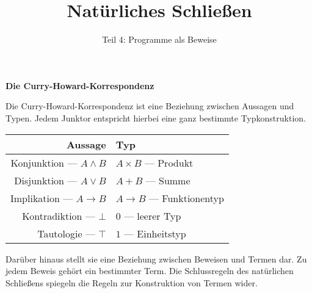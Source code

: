 \documentclass[8pt]{beamer}
\title{Natürliches Schließen}
\subtitle{Teil 4: Programme als Beweise}
\date{}
\newcommand{\strong}[1]{\textsf{\textbf{#1}}}
\newcommand{\centerheadline}[1]{%
  \begin{center}\strong{#1}\end{center}}
\newcommand{\cond}{\rightarrow}
\begin{document}
\begin{frame}
\maketitle
\end{frame}

\begin{frame}
\centerheadline{Die Curry-Howard-Korrespondenz}
\end{frame}

\begin{frame}
Die Curry-Howard-Korrespondenz ist eine Beziehung zwischen Aussagen und
Typen. Jedem Junktor entspricht hierbei eine ganz bestimmte Typkonstruktion.\pause
\begin{center}
\begin{tabular}{rl}
\toprule
\strong{Aussage} & \strong{Typ}\\
\midrule
Konjunktion --- $A\land B$ & $A\times B$ --- Produkt\\
Disjunktion --- $A\lor B$ & $A+B$ --- Summe\\
Implikation --- $A\cond B$ & $A\to B$ --- Funktionentyp\\
Kontradiktion --- $\bot$ & $0$ --- leerer Typ\\
Tautologie --- $\top$ & $1$ --- Einheitstyp\\
\bottomrule
\end{tabular}
\end{center}\pause
Darüber hinaus stellt sie eine Beziehung zwischen Beweisen und Termen
dar. Zu jedem Beweis gehört ein bestimmter Term. Die Schlussregeln des
natürlichen Schließens spiegeln die Regeln zur Konstruktion von
Termen wider.
\end{frame}
\end{document}
